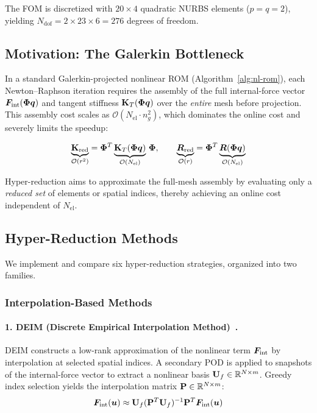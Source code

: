 The FOM is discretized with $20 \times 4$ quadratic NURBS elements ($p = q = 2$), yielding $N_{\text{dof}} = 2 \times 23 \times 6 = 276$ degrees of freedom.

\subsection{Motivation: The Galerkin Bottleneck}

In a standard Galerkin-projected nonlinear ROM (Algorithm~\ref{alg:nl-rom}), each Newton--Raphson iteration requires the assembly of the full internal-force vector $\bm{F}_{\text{int}}(\mathbf{\Phi}\bm{q})$ and tangent stiffness $\mathbf{K}_T(\mathbf{\Phi}\bm{q})$ over the \emph{entire} mesh before projection. This assembly cost scales as $\mathcal{O}(N_{\text{el}} \cdot n_g^2)$, which dominates the online cost and severely limits the speedup:

\begin{equation}
    \underbrace{\mathbf{K}_{\text{red}}}_{\mathcal{O}(r^2)} = \mathbf{\Phi}^T \underbrace{\mathbf{K}_T(\mathbf{\Phi}\bm{q})}_{\mathcal{O}(N_{\text{el}})}\, \mathbf{\Phi}, \qquad \underbrace{\bm{R}_{\text{red}}}_{\mathcal{O}(r)} = \mathbf{\Phi}^T \underbrace{\bm{R}(\mathbf{\Phi}\bm{q})}_{\mathcal{O}(N_{\text{el}})}
\end{equation}

Hyper-reduction aims to approximate the full-mesh assembly by evaluating only a \emph{reduced set} of elements or spatial indices, thereby achieving an online cost independent of $N_{\text{el}}$.

\subsection{Hyper-Reduction Methods}

We implement and compare six hyper-reduction strategies, organized into two families.

\subsubsection{Interpolation-Based Methods}

\paragraph{1. DEIM (Discrete Empirical Interpolation Method)~\cite{chaturantabut2010}.}
DEIM constructs a low-rank approximation of the nonlinear term $\bm{F}_{\text{int}}$ by interpolation at selected spatial indices. A secondary POD is applied to snapshots of the internal-force vector to extract a nonlinear basis $\mathbf{U}_f \in \mathbb{R}^{N \times m}$. Greedy index selection yields the interpolation matrix $\mathbf{P} \in \mathbb{R}^{N \times m}$:
\begin{equation}
    \bm{F}_{\text{int}}(\bm{u}) \approx \mathbf{U}_f (\mathbf{P}^T \mathbf{U}_f)^{-1} \mathbf{P}^T \bm{F}_{\text{int}}(\bm{u})
    \label{eq:deim}
\end{equation}

